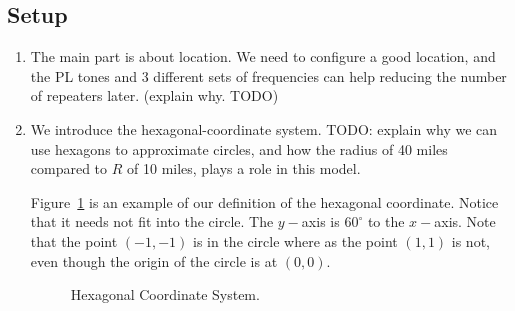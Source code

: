 \documentclass{icmmcm}
\begin{document}
\subsection{Setup}
\begin{enumerate}
\item The main part is about location. We need to configure a good location, and the PL tones and 3 different sets of frequencies can help reducing the number of repeaters later. (explain why. TODO)
\item We introduce the hexagonal-coordinate system. TODO: explain why we can use hexagons to approximate circles, and how the radius of 40 miles compared to $R$ of 10 miles, plays a role in this model.

Figure~\ref{fig:hex_coor} is an example of our definition of the hexagonal coordinate. Notice that it needs not fit into the circle. The $y-$axis is $60^\circ$ to the $x-$axis. Note that the point $(-1,-1)$ is in the circle where as the point $(1,1)$ is not, even though the origin of the circle is at $(0,0).$
\begin{figure}[ht]
\begin{center}
\end{center}
\caption[Hexagonal Coordinate System]{Hexagonal Coordinate System.\label{hex_coor}}%
\label{fig:hex_coor}
\end{figure}


\end{enumerate}
\end{document}
